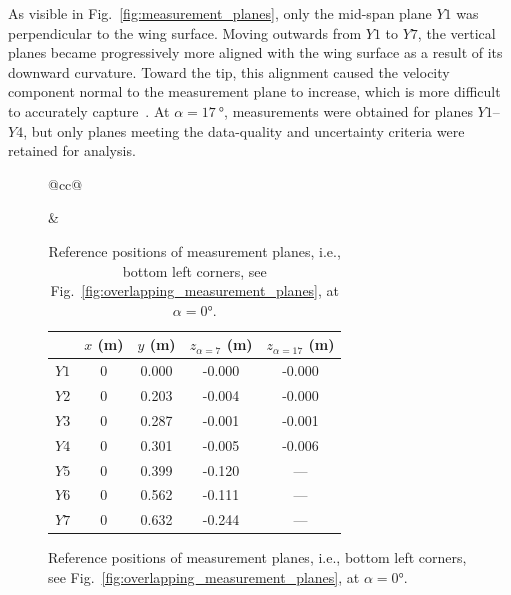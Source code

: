 \documentclass[wes, manuscript]{copernicus}
\begin{document}
As visible in Fig.~\ref{fig:measurement_planes}, only the mid-span plane $Y1$ was perpendicular to the wing surface. 
Moving outwards from $Y1$ to $Y7$, the vertical planes became progressively more aligned with the wing surface as a result of its downward curvature. 
Toward the tip, this alignment caused the velocity component normal to the measurement plane to increase, which is more difficult to accurately capture~\citep{PrasadAdrian1993,Prasad2000}. 
At $\alpha = 17~\unit{\degree}$, measurements were obtained for planes $Y1$--$Y4$, but only planes meeting the data-quality and uncertainty criteria were retained for analysis.
%
\begin{figure}[htp]
    \centering
    \begin{tabular}{@{}cc@{}}
        \begin{minipage}{0.45\textwidth}
            \centering
            \caption{Arrangement of the measurement planes along the span, for $\alpha = 7$\unit{\degree} at 10\% $x/c$ aft of the mid-span leading edge.}
            \label{fig:measurement_planes}
        \end{minipage}
        &
        \begin{minipage}{0.45\textwidth}
            \centering
            \small
            \begin{table}[H]
                \caption{Reference positions of measurement planes, i.e., bottom left corners, see Fig.~\ref{fig:overlapping_measurement_planes}, at $\alpha = 0\unit{\degree}$.}
                \label{tab:measurement_plane_locations}
                \begin{tabular}{l c c c c}
                    \hline
                    & $x$ (\unit{m}) & $y$ (\unit{m}) & $z_{\alpha=7}$ (\unit{m}) & $z_{\alpha=17}$ (\unit{m}) \\ \hline
                    $Y1$ & 0 & 0.000 & -0.000 & -0.000 \\
                    $Y2$ & 0 & 0.203 & -0.004 & -0.000 \\
                    $Y3$ & 0 & 0.287 & -0.001 & -0.001 \\
                    $Y4$ & 0 & 0.301 & -0.005 & -0.006 \\
                    $Y5$ & 0 & 0.399 & -0.120 & --- \\
                    $Y6$ & 0 & 0.562 & -0.111 & --- \\
                    $Y7$ & 0 & 0.632 & -0.244 & --- \\ \hline
                \end{tabular}
            \end{table}
        \end{minipage}
    \end{tabular}
\end{figure}
%
\end{document}

